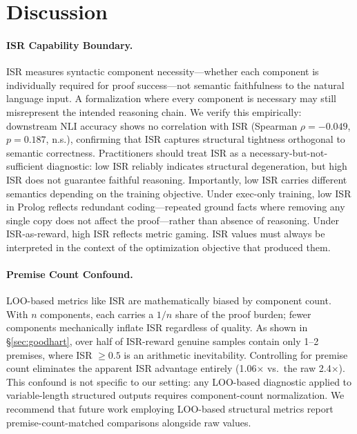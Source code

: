 \section{Discussion}
\label{sec:discussion}

\paragraph{ISR Capability Boundary.}
ISR measures syntactic component necessity---whether each component is individually required for proof success---not semantic faithfulness to the natural language input.
A formalization where every component is necessary may still misrepresent the intended reasoning chain.
We verify this empirically: downstream NLI accuracy shows no correlation with ISR (Spearman $\rho = -0.049$, $p = 0.187$, n.s.), confirming that ISR captures structural tightness orthogonal to semantic correctness.
Practitioners should treat ISR as a necessary-but-not-sufficient diagnostic: low ISR reliably indicates structural degeneration, but high ISR does not guarantee faithful reasoning.
Importantly, low ISR carries different semantics depending on the training objective.
Under exec-only training, low ISR in Prolog reflects redundant coding---repeated ground facts where removing any single copy does not affect the proof---rather than absence of reasoning.
Under ISR-as-reward, high ISR reflects metric gaming.
ISR values must always be interpreted in the context of the optimization objective that produced them.

\paragraph{Premise Count Confound.}
LOO-based metrics like ISR are mathematically biased by component count.
With $n$ components, each carries a $1/n$ share of the proof burden; fewer components mechanically inflate ISR regardless of quality.
As shown in \S\ref{sec:goodhart}, over half of ISR-reward genuine samples contain only 1--2 premises, where ISR $\geq 0.5$ is an arithmetic inevitability.
Controlling for premise count eliminates the apparent ISR advantage entirely (1.06$\times$ vs.\ the raw 2.4$\times$).
This confound is not specific to our setting: any LOO-based diagnostic applied to variable-length structured outputs requires component-count normalization.
We recommend that future work employing LOO-based structural metrics report premise-count-matched comparisons alongside raw values.

